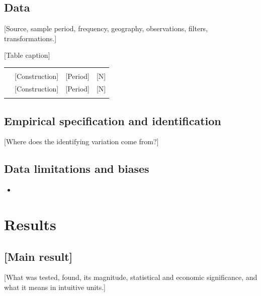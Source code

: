 \documentclass{lrreview}
\begin{document}
\subsection{Data}
[Source, sample period, frequency, geography, observations, filters, transformations.]

\begin{lrtable}{[Table caption]}\label{tab:data}
\begin{tabularx}{\linewidth}{@{}L L L r@{}}
\lrtoprule
{} &  &  & \\
\lrheadrule
{} & [Construction] & [Period] & [N]\\
\lrrowrule
{} & [Construction] & [Period] & [N]\\
\lrbottomrule
\end{tabularx}
\end{lrtable}

\subsection{Empirical specification and identification}
[Where does the identifying variation come from?]

\subsection{Data limitations and biases}
\begin{itemize}
  \item{}
\end{itemize}

\section{Results}

\subsection{[Main result]}
 [What was tested, found, its magnitude, statistical and economic
significance, and what it means in intuitive units.]

\end{document}
